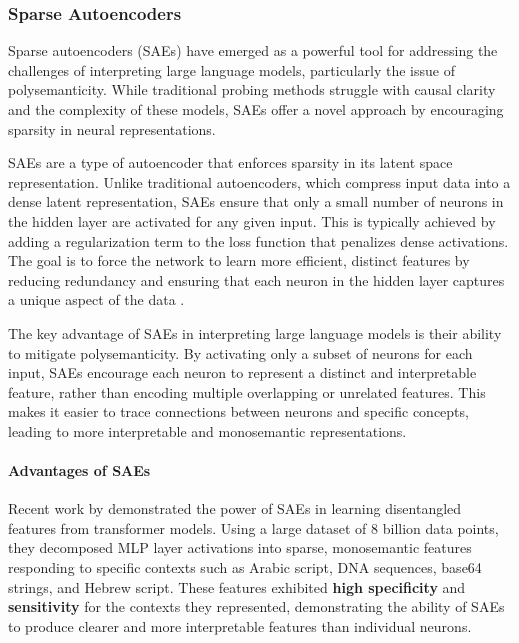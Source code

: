 \documentclass[sigconf,authoryear]{acmart}
\begin{document}
  \subsubsection{Sparse Autoencoders}

  Sparse autoencoders (SAEs) have emerged as a powerful tool for addressing the challenges of interpreting large language models, particularly the issue of polysemanticity. While traditional probing methods struggle with causal clarity and the complexity of these models, SAEs offer a novel approach by encouraging sparsity in neural representations.
  
  SAEs are a type of autoencoder that enforces sparsity in its latent space representation. Unlike traditional autoencoders, which compress input data into a dense latent representation, SAEs ensure that only a small number of neurons in the hidden layer are activated for any given input. This is typically achieved by adding a regularization term to the loss function that penalizes dense activations. The goal is to force the network to learn more efficient, distinct features by reducing redundancy and ensuring that each neuron in the hidden layer captures a unique aspect of the data \citep{cunningham2023sparseautoencodershighlyinterpretable, bricken2023monosemanticity}.
  
  The key advantage of SAEs in interpreting large language models is their ability to mitigate polysemanticity. By activating only a subset of neurons for each input, SAEs encourage each neuron to represent a distinct and interpretable feature, rather than encoding multiple overlapping or unrelated features. This makes it easier to trace connections between neurons and specific concepts, leading to more interpretable and monosemantic representations.
  
  \paragraph{Advantages of SAEs} Recent work by \citet{bricken2023monosemanticity} demonstrated the power of SAEs in learning disentangled features from transformer models. Using a large dataset of 8 billion data points, they decomposed MLP layer activations into sparse, monosemantic features responding to specific contexts such as Arabic script, DNA sequences, base64 strings, and Hebrew script. These features exhibited \textbf{high specificity} and \textbf{sensitivity} for the contexts they represented, demonstrating the ability of SAEs to produce clearer and more interpretable features than individual neurons.
  
\end{document}
